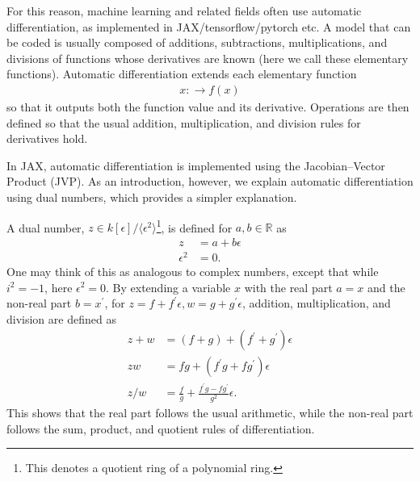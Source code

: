 For this reason, machine learning and related fields often use automatic differentiation, as implemented in {\sf JAX/tensorflow/pytorch} etc. A model that can be coded is usually composed of additions, subtractions, multiplications, and divisions of functions whose derivatives are known (here we call these elementary functions). Automatic differentiation extends each elementary function
\begin{align}
x:\to f(x)
\end{align}
so that it outputs both the function value and its derivative. Operations are then defined so that the usual addition, multiplication, and division rules for derivatives hold.

In {\sf JAX}, automatic differentiation is implemented using the Jacobian–Vector Product (JVP). As an introduction, however, we explain automatic differentiation using dual numbers, which provides a simpler explanation.

A dual number, $z \in k[\epsilon]/\langle \epsilon^2\rangle$\footnote{This denotes a quotient ring of a polynomial ring.}, is defined for $a, b \in \mathbb{R}$ as
\begin{align}
z &= a + b \epsilon \\
\epsilon^2 &= 0 .
\end{align}
One may think of this as analogous to complex numbers, except that while $i^2 = -1$, here $\epsilon^2 = 0$. By extending a variable $x$ with the real part $a = x$ and the non-real part $b = x^\prime$, for $z = f + f^\prime \epsilon, w = g + g^\prime \epsilon$, addition, multiplication, and division are defined as
\begin{align}
\label{eq:add_ad_dual}
z + w &= (f + g) + (f^\prime + g^\prime) \epsilon \\
\label{eq:mul_ad_dual}
z w &= f g + (f^\prime g + f g^\prime) \epsilon \\
z/w &= \frac{f}{g} + \frac{f^\prime g - f g^\prime}{g^2} \epsilon .
\end{align}
This shows that the real part follows the usual arithmetic, while the non-real part follows the sum, product, and quotient rules of differentiation.

